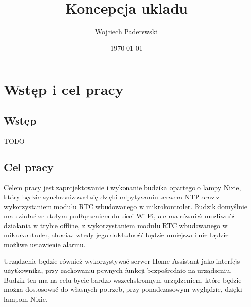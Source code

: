 \documentclass[../main.tex]{subfiles}
\author{Wojciech Paderewski}
\date{\today}
\title{Koncepcja ukladu}
\begin{document}
\section{Wstęp i cel pracy}
\subsection{Wstęp}
TODO
\subsection{Cel pracy}
Celem pracy jest zaprojektowanie i wykonanie budzika opartego o lampy Nixie, który będzie synchronizował się dzięki odpytywaniu serwera NTP oraz
z wykorzystaniem modułu RTC wbudowanego w mikrokontroler. Budzik domyślnie ma działać ze stałym podłączeniem do sieci Wi-Fi, ale ma również możliwość
działania w trybie offline, z wykorzystaniem modułu RTC wbudowanego w mikrokontroler, chociaż wtedy jego dokładność będzie mniejsza i nie będzie możliwe
ustawienie alarmu. 

Urządzenie będzie również wykorzystywać serwer Home Assistant jako interfejs użytkownika, przy zachowaniu pewnych funkcji bezpośrednio
na urządzeniu. Budzik ten ma na celu bycie bardzo wszechstronnym urządzeniem, które będzie można dostosować do własnych potrzeb, przy ponadczasowym wyglądzie, 
dzięki lampom Nixie.
\end{document}
